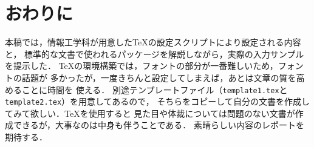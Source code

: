 \section{おわりに}
本稿では，情報工学科が用意した{\TeX}の設定スクリプトにより設定される内容と，
標準的な文書で使われるパッケージを解説しながら，実際の入力サンプルを提示した．
{\TeX}の環境構築では，フォントの部分が一番難しいため，フォントの話題が
多かったが，一度きちんと設定してしまえば，あとは文章の質を高めることに時間を
使える．
別途テンプレートファイル（\texttt{template1.tex}と\texttt{template2.tex}）を用意してあるので，
そちらをコピーして自分の文書を作成してみて欲しい．{\TeX}を使用すると
見た目や体裁については問題のない文書が作成できるが，大事なのは中身も伴うことである．
素晴らしい内容のレポートを期待する．


